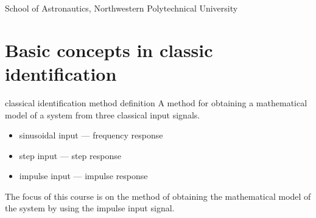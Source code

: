 
\newcommand{\vect}[1]{\boldsymbol{#1}}

\def\lecturename{System Identification}

\title{\insertlecture}

\author{Xing Chao}

\institute
{
School of Astronautics, Northwestern Polytechnical University
}


\subtitle{}
\date{}



\begin{frame}
  \maketitle
\end{frame}


\section{Basic concepts in classic identification}


\begin{frame}{classical identification method definition}
A method for obtaining a mathematical model of a system from three classical input signals.
\begin{itemize}
\item sinusoidal input --- frequency response %
\item step input --- step response %
\item impulse input --- impulse response %
\end{itemize}
The focus of this course is on the method of obtaining the mathematical model of the system by using the impulse input signal.
\end{frame}

